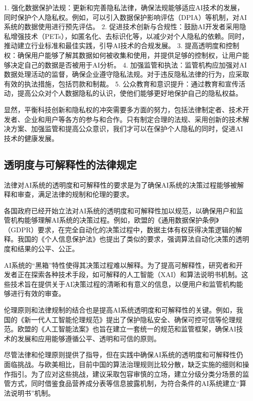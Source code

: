 1. 强化数据保护法规：更新和完善隐私法律，确保法规能够适应AI技术的发展，同时保护个人隐私权。例如，可以引入数据保护影响评估（DPIA）等机制，对AI系统的数据使用进行预先评估。
2. 促进技术创新与合规性：鼓励AI开发者采用隐私增强技术（PETs），如匿名化、去标识化等，以减少对个人隐私的依赖。同时，推动建立行业标准和最佳实践，引导AI技术的合规发展。
3. 提高透明度和控制权：确保用户能够了解其数据如何被收集和使用，并提供足够的控制权，让用户能够决定自己的数据是否被用于AI分析。
4. 加强监管和执法：监管机构应加强对AI数据处理活动的监督，确保企业遵守隐私法规。对于违反隐私法律的行为，应采取有效的执法措施，包括罚款和制裁。
5. 公众教育和意识提升：通过教育和宣传活动，提高公众对个人数据隐私的认识，使他们能够更好地保护自己的隐私权益。

显然，平衡科技创新和隐私权的冲突需要多方面的努力，包括法律制定者、技术开发者、企业和用户等各方的参与和合作。只有制定合理的法规、采用创新的技术解决方案、加强监管和提高公众意识，我们才可以在保护个人隐私的同时，促进AI技术的健康发展。

\subsection{透明度与可解释性的法律规定}

法律对AI系统的透明度和可解释性的要求是为了确保AI系统的决策过程能够被解释和审查，满足法律的规制和伦理的要求。

各国政府已经开始立法对AI系统的透明度和可解释性加以规范，以确保用户和监管机构能够理解AI系统的决策过程。例如，欧盟的《通用数据保护条例》（GDPR）要求，在完全自动化的决策过程中，数据主体有权获得决策逻辑的解释。我国的《个人信息保护法》也提出了类似的要求，强调算法自动化决策的透明度和结果的公平、公正。

AI系统的“黑箱”特性使得其决策过程难以解释。为了提高可解释性，研究者和开发者正在探索各种技术手段，如可解释的人工智能（XAI）和算法说明书机制。这些技术旨在提供关于AI决策过程的清晰和有意义的信息，以便用户和监管机构能够进行有效的审查。

伦理原则和法律规制的结合也是提高AI系统透明度和可解释性的关键。例如，我国的《新一代人工智能伦理规范》提出了保护隐私安全、确保可控可信等伦理规范。欧盟的《人工智能法案》也旨在建立一套统一的规范和监管框架，确保AI技术的发展和应用能够遵循公平、透明和可信的原则。

尽管法律和伦理原则提供了指导，但在实践中确保AI系统的透明度和可解释性仍面临挑战。与欧美相比，目前中国的算法治理规则比较分散，缺乏实施的细则和操作指引。为了应对这些挑战，建议采取包容审慎的立场，建立分级分类分场景的监管方式，同时借鉴食品营养成分表等信息披露机制，为符合条件的AI系统建立“算法说明书”机制。

